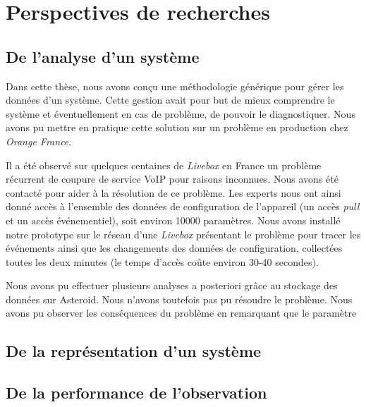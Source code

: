 \section{Perspectives de recherches}\label{sec:conclusion:perspectives}
\subsection{De l'analyse d'un système}
Dans cette thèse, nous avons conçu une méthodologie générique pour gérer les données d'un système. Cette gestion avait pour but de mieux comprendre le système et éventuellement en cas de problème, de pouvoir le diagnostiquer. Nous avons pu mettre en pratique cette solution sur un problème en production chez \textit{Orange France}.

Il a été observé sur quelques centaines de \textit{Livebox} en France un problème récurrent de coupure de service VoIP pour raisons inconnues. Nous avons été contacté pour aider à la résolution de ce problème. Les experts nous ont ainsi donné accès à l'ensemble des données de configuration de l'appareil (un accès \textit{pull} et un accès événementiel), soit environ 10000 paramètres. Nous avons installé notre prototype sur le réseau d'une \textit{Livebox} présentant le problème pour tracer les événements ainsi que les changements des données de configuration, collectées toutes les deux minutes (le temps d'accès coûte environ 30-40 secondes).

Nous avons pu effectuer plusieurs analyses a posteriori grâce au stockage des données sur Asteroid. Nous n'avons toutefois pas pu résoudre le problème. Nous avons pu observer les conséquences du problème en remarquant que le paramètre 

% 

\subsection{De la représentation d'un système}
\subsection{De la performance de l'observation}